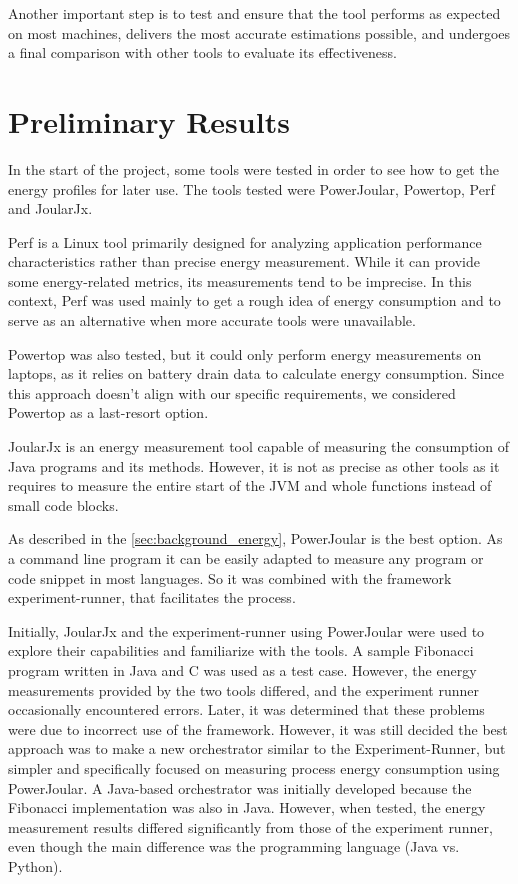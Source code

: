 \documentclass[sigplan]{acmart}
\begin{document}
Another important step is to test and ensure that the tool performs as expected on most machines, delivers the most accurate estimations possible, and undergoes a final comparison with other tools to evaluate its effectiveness.

\section{Preliminary Results} \label{sec:preliminaryresults}

In the start of the project, some tools were tested in order to see how to get the energy profiles for later use. The tools tested were PowerJoular, Powertop, Perf and JoularJx.

Perf is a Linux tool primarily designed for analyzing application performance characteristics rather than precise energy measurement. While it can provide some energy-related metrics, its measurements tend to be imprecise. In this context, Perf was used mainly to get a rough idea of energy consumption and to serve as an alternative when more accurate tools were unavailable.

Powertop was also tested, but it could only perform energy measurements on laptops, as it relies on battery drain data to calculate energy consumption. Since this approach doesn't align with our specific requirements, we considered Powertop as a last-resort option.

JoularJx is an energy measurement tool capable of measuring the consumption of Java programs and its methods. However, it is not as precise as other tools as it requires to measure the entire start of the JVM and whole functions instead of small code blocks.

As described in the \ref{sec:background_energy}, PowerJoular is the best option. As a command line program it can be easily adapted to measure any program or code snippet in most languages. So it was combined with the framework experiment-runner, that facilitates the process.

Initially, JoularJx and the experiment-runner using PowerJoular were used to explore their capabilities and familiarize with the tools. A sample Fibonacci program written in Java and C was used as a test case. However, the energy measurements provided by the two tools differed, and the experiment runner occasionally encountered errors. Later, it was determined that these problems were due to incorrect use of the framework. However, it was still decided the best approach was to make a new orchestrator similar to the Experiment-Runner, but simpler and specifically focused on measuring process energy consumption using PowerJoular. A Java-based orchestrator was initially developed because the Fibonacci implementation was also in Java. However, when tested, the energy measurement results differed significantly from those of the experiment runner, even though the main difference was the programming language (Java vs. Python).
\end{document}
